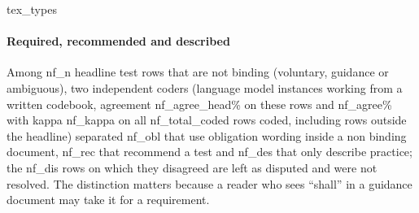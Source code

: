 \documentclass[conference]{IEEEtran}
\begin{document}
\begin{table}[t]\centering\small
{{tex_types}}
\caption{Headline test provisions by primary test type and binding status (mandatory or conditional counted as binding).}\label{tab:types}
\end{table}

\paragraph{Required, recommended and described} Among {{nf_n}} headline test rows that are not binding (voluntary, guidance or ambiguous), two independent coders (language model instances working from a written codebook, agreement {{nf_agree_head}}\% on these rows and {{nf_agree}}\% with kappa {{nf_kappa}} on all {{nf_total_coded}} rows coded, including rows outside the headline) separated {{nf_obl}} that use obligation wording inside a non binding document, {{nf_rec}} that recommend a test and {{nf_des}} that only describe practice; the {{nf_dis}} rows on which they disagreed are left as disputed and were not resolved. The distinction matters because a reader who sees ``shall'' in a guidance document may take it for a requirement.
\end{document}
